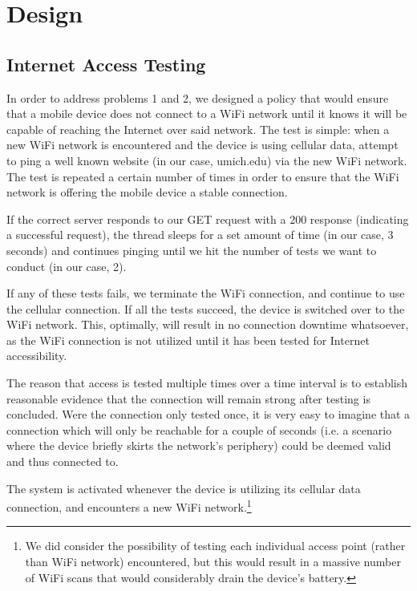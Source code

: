 \section{Design}
\label{sec:design}


\subsection{Internet Access Testing} %
In order to address problems 1 and 2, we designed a policy that would ensure that a mobile device does not connect to a WiFi network until it knows it will be capable of reaching the Internet over said network. The test is simple: when a new WiFi network is encountered and the device is using cellular data, attempt to ping a well known website (in our case, umich.edu) via the new WiFi network. The test is repeated a certain number of times in order to ensure that the WiFi network is offering the mobile device a stable connection.

If the correct server responds to our GET request with a 200 response (indicating a successful request), the thread sleeps for a set amount of time (in our case, 3 seconds) and continues pinging until we hit the number of tests we want to conduct (in our case, 2).

If any of these tests fails, we terminate the WiFi connection, and continue to use the cellular connection. If all the tests succeed, the device is switched over to the WiFi network. This, optimally, will result in no connection downtime whatsoever, as the WiFi connection is not utilized until it has been tested for Internet accessibility.

The reason that access is tested multiple times over a time interval is to establish reasonable evidence that the connection will remain strong after testing is concluded. Were the connection only tested once, it is very easy to imagine that a connection which will only be reachable for a couple of seconds (i.e. a scenario where the device briefly skirts the network's periphery) could be deemed valid and thus connected to.

The system is activated whenever the device is utilizing its cellular data connection, and encounters a new WiFi network.\footnote{We did consider the possibility of testing each individual access point (rather than WiFi network) encountered, but this would result in a massive number of WiFi scans that would considerably drain the device's battery.}


